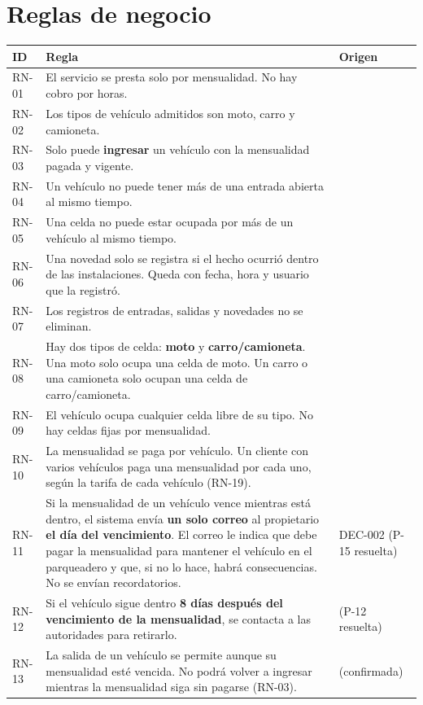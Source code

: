 \section{Reglas de negocio}
\begin{longtable}{>{\raggedright\arraybackslash}p{1.5cm}>{\raggedright\arraybackslash}p{9.6cm}>{\raggedright\arraybackslash}p{3.3cm}}
\toprule
\textbf{ID} & \textbf{Regla} & \textbf{Origen}\\
\midrule\endhead
RN-01 & El servicio se presta solo por mensualidad. No hay cobro por horas. & [E][U]\\
RN-02 & Los tipos de vehículo admitidos son moto, carro y camioneta. & [U]\\
RN-03 & Solo puede \textbf{ingresar} un vehículo con la mensualidad pagada y vigente. & [U]\\
RN-04 & Un vehículo no puede tener más de una entrada abierta al mismo tiempo. & [I]\\
RN-05 & Una celda no puede estar ocupada por más de un vehículo al mismo tiempo. & [I]\\
RN-06 & Una novedad solo se registra si el hecho ocurrió dentro de las instalaciones. Queda con fecha, hora y usuario que la registró. & [U]\\
RN-07 & Los registros de entradas, salidas y novedades no se eliminan. & [I]\\
RN-08 & Hay dos tipos de celda: \textbf{moto} y \textbf{carro/camioneta}. Una moto solo ocupa una celda de moto. Un carro o una camioneta solo ocupan una celda de carro/camioneta. & [U]\\
RN-09 & El vehículo ocupa cualquier celda libre de su tipo. No hay celdas fijas por mensualidad. & [U]\\
RN-10 & La mensualidad se paga por vehículo. Un cliente con varios vehículos paga una mensualidad por cada uno, según la tarifa de cada vehículo (RN-19). & [U]\\
RN-11 & Si la mensualidad de un vehículo vence mientras está dentro, el sistema envía \textbf{un solo correo} al propietario \textbf{el día del vencimiento}. El correo le indica que debe pagar la mensualidad para mantener el vehículo en el parqueadero y que, si no lo hace, habrá consecuencias. No se envían recordatorios. & [U] DEC-002 (P-15 resuelta)\\
RN-12 & Si el vehículo sigue dentro \textbf{8 días después del vencimiento de la mensualidad}, se contacta a las autoridades para retirarlo. & [U] (P-12 resuelta)\\
RN-13 & La salida de un vehículo se permite aunque su mensualidad esté vencida. No podrá volver a ingresar mientras la mensualidad siga sin pagarse (RN-03). & [U] (confirmada)\\

\end{longtable}
